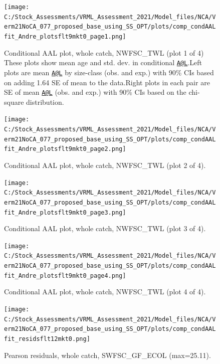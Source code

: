 \documentclass[
  english,
  a4paper,
]{article}
\begin{document}
\begin{figure}
\centering
\texttt{[image: C:/Stock\_Assessments/VRML\_Assessment\_2021/Model\_files/NCA/Verm21NoCA\_077\_proposed\_base\_using\_SS\_OPT/plots/comp\_condAALfit\_Andre\_plotsflt9mkt0\_page1.png]}
\caption{Conditional AAL plot, whole catch, NWFSC\_TWL (plot 1 of 4)
These plots show mean age and std. dev. in conditional \href{mailto:A@L}{\nolinkurl{A@L}}.Left plots are mean \href{mailto:A@L}{\nolinkurl{A@L}} by size-class (obs. and exp.) with 90\% CIs based on adding 1.64 SE of mean to the data.Right plots in each pair are SE of mean \href{mailto:A@L}{\nolinkurl{A@L}} (obs. and exp.) with 90\% CIs based on the chi-square distribution.\label{fig:comp_condAALfit_Andre_plotsflt9mkt0_page1}}
\end{figure}

\begin{figure}
\centering
\texttt{[image: C:/Stock\_Assessments/VRML\_Assessment\_2021/Model\_files/NCA/Verm21NoCA\_077\_proposed\_base\_using\_SS\_OPT/plots/comp\_condAALfit\_Andre\_plotsflt9mkt0\_page2.png]}
\caption{Conditional AAL plot, whole catch, NWFSC\_TWL (plot 2 of 4).\label{fig:comp_condAALfit_Andre_plotsflt9mkt0_page2}}
\end{figure}

\begin{figure}
\centering
\texttt{[image: C:/Stock\_Assessments/VRML\_Assessment\_2021/Model\_files/NCA/Verm21NoCA\_077\_proposed\_base\_using\_SS\_OPT/plots/comp\_condAALfit\_Andre\_plotsflt9mkt0\_page3.png]}
\caption{Conditional AAL plot, whole catch, NWFSC\_TWL (plot 3 of 4).\label{fig:comp_condAALfit_Andre_plotsflt9mkt0_page3}}
\end{figure}

\begin{figure}
\centering
\texttt{[image: C:/Stock\_Assessments/VRML\_Assessment\_2021/Model\_files/NCA/Verm21NoCA\_077\_proposed\_base\_using\_SS\_OPT/plots/comp\_condAALfit\_Andre\_plotsflt9mkt0\_page4.png]}
\caption{Conditional AAL plot, whole catch, NWFSC\_TWL (plot 4 of 4).\label{fig:comp_condAALfit_Andre_plotsflt9mkt0_page4}}
\end{figure}

\begin{figure}
\centering
\texttt{[image: C:/Stock\_Assessments/VRML\_Assessment\_2021/Model\_files/NCA/Verm21NoCA\_077\_proposed\_base\_using\_SS\_OPT/plots/comp\_condAALfit\_residsflt12mkt0.png]}
\caption{Pearson residuals, whole catch, SWFSC\_GF\_ECOL (max=25.11).\label{fig:comp_condAALfit_residsflt12mkt0}}
\end{figure}
\end{document}
